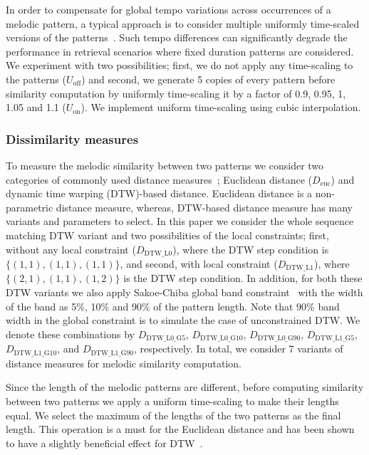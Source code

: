 In order to compensate for global tempo variations across occurrences of a melodic pattern, a typical approach is to consider multiple uniformly time-scaled versions of the patterns~\cite{mazzoni2001melody, kotsifakos2012survey}. Such tempo differences can significantly degrade the performance in retrieval scenarios where fixed duration patterns are considered. We experiment with two possibilities; first,  we do not apply any time-scaling to the patterns ($U_{\mathrm{off}}$) and second, we generate 5 copies of every pattern before similarity computation by uniformly time-scaling it by a factor of 0.9, 0.95, 1, 1.05 and 1.1 ($U_{\mathrm{on}}$). We implement uniform time-scaling using cubic interpolation.

\subsubsection{Dissimilarity measures}

To measure the melodic similarity between two patterns we consider two categories of commonly used distance measures~\cite{Ross2012b, Rao2014, muller2007information}; Euclidean distance ($D_{\mathrm{euc}}$) and dynamic time warping (DTW)-based distance. Euclidean distance is a non-parametric distance measure, whereas, DTW-based distance measure has many variants and parameters to select. In this paper we consider the whole sequence matching DTW variant and two possibilities of the local constraints; first, without any local constraint ($D_{\mathrm{DTW\_L0}}$), where the DTW step condition is $\lbrace(1,1), (1,1), (1,1)\rbrace$, and second, with local constraint ($D_{\mathrm{DTW\_L1}}$), where $\lbrace(2,1), (1,1), (1,2)\rbrace$ is the DTW step condition. In addition, for both these DTW variants we also apply Sakoe-Chiba global band constraint~\cite{Sakoe78TASLP} with the width of the band as 5\%, 10\% and 90\% of the pattern length. Note that 90\% band width in the global constraint is to simulate the case of unconstrained DTW. We denote these combinations by $D_{\mathrm{DTW\_L0\_G5}}$, $D_{\mathrm{DTW\_L0\_G10}}$, $D_{\mathrm{DTW\_L0\_G90}}$, $D_{\mathrm{DTW\_L1\_G5}}$, $D_{\mathrm{DTW\_L1\_G10}}$, and $D_{\mathrm{DTW\_L1\_G90}}$, respectively. In total, we consider 7 variants of distance measures for melodic similarity computation.

Since the length of the melodic patterns are different, before computing similarity between two patterns we apply  a uniform time-scaling to make their lengths equal. We select the maximum of the lengths of the two patterns as the final length. This operation is a must for the Euclidean distance and has been shown to have a slightly beneficial effect for DTW~\cite{Ratanamahatana2004}.

